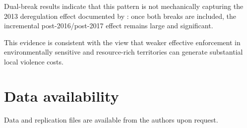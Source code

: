 \documentclass[preprint,12pt]{elsarticle}
\begin{document}
Dual-break results indicate that this pattern is not mechanically capturing the 2013 deregulation effect documented by \citealp{pereira_pucci_2024}: once both breaks are included, the incremental post-2016/post-2017 effect remains large and significant.

This evidence is consistent with the view that weaker effective enforcement in environmentally sensitive and resource-rich territories can generate substantial local violence costs.

\section*{Data availability}
Data and replication files are available from the authors upon request.



\end{document}

